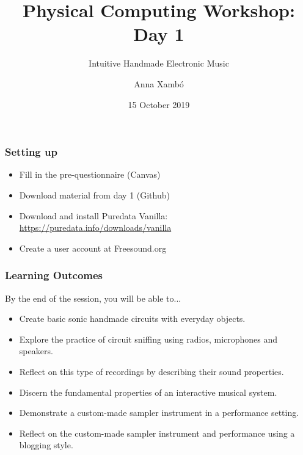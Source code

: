 \documentclass[screen, aspectratio=169]{beamer}
\title[PCW-d1]{Physical Computing Workshop: Day 1}
\subtitle{Intuitive Handmade Electronic Music}
\author[A. Xamb{\'o}]{Anna Xamb{\'o}}
\institute[NTNU]{Department of Music, NTNU}
\date{15 October 2019}
\begin{document}
\begin{frame}
  \titlepage
\end{frame}
%
\begin{frame}
\frametitle{Setting up}
\begin{itemize}
\item Fill in the pre-questionnaire (Canvas)
\item Download material from day 1 (Github)
\item Download and install Puredata Vanilla: \url{https://puredata.info/downloads/vanilla}
\item Create a user account at Freesound.org
\end{itemize}
\end{frame}
%
\begin{frame}
\frametitle{Learning Outcomes}
By the end of the session,  you will be able to...
\begin{itemize}
\item Create basic sonic handmade circuits with everyday objects.
\item Explore the practice of circuit sniffing using radios, microphones and speakers.
\item Reflect on this type of recordings by describing their sound properties.
\item Discern the fundamental properties of an interactive musical system.
\item Demonstrate a custom-made sampler instrument in a performance setting.
\item Reflect on the custom-made sampler instrument and performance using a blogging style.
\end{itemize}
\end{frame}
%
\end{document}
